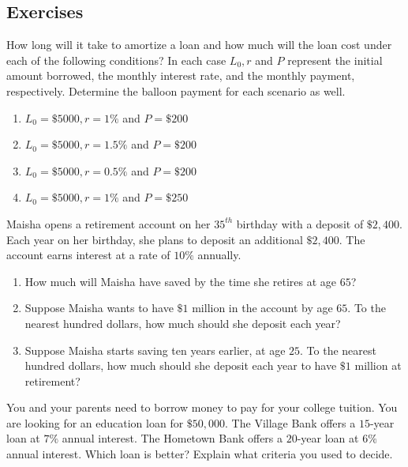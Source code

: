 \documentclass[10pt,]{book}
\theoremstyle{ptxdefinitionnotitle}
\theoremstyle{ptxdefinitiontitle}
\theoremstyle{ptxdefinitionnotitle}
\theoremstyle{ptxdefinitiontitle}
\theoremstyle{ptxdefinitionnotitle}
\theoremstyle{ptxdefinitiontitle}
\numberwithin{equation}{section}
\begin{document}
\subsection*{Exercises}\hypertarget{exercises-3}{}
\begin{divisionexercise}{1}\hypertarget{exercise-12}{}
\hypertarget{p-60}{}%
How long will it take to amortize a loan and how much will the loan cost under each of the following conditions?  In each case \(L_0, r\) and \(P\) represent the initial amount borrowed, the monthly interest rate, and the monthly payment, respectively. Determine the balloon payment for each scenario as well.%
\leavevmode%
\begin{enumerate}[label=(\alph*)]
\item\hypertarget{li-45}{}\(L_0=\$5000, r=1\%\) and \(P=\$200\)%
\item\hypertarget{li-46}{}\(L_0=\$5000, r=1.5\%\) and \(P=\$200\)%
\item\hypertarget{li-47}{}\(L_0=\$5000, r=0.5\%\) and \(P=\$200 \)%
\item\hypertarget{li-48}{}\(L_0=\$5000, r=1\%\) and \(P=\$250\)%
\end{enumerate}
\end{divisionexercise}%
\begin{divisionexercise}{2}\hypertarget{exercise-13}{}
\hypertarget{p-61}{}%
Maisha opens a retirement account on her \(35^{th}\) birthday with a deposit of \(\$2,400\).  Each year on her birthday, she plans to deposit an additional \(\$2,400\).  The account earns interest at a rate of \(10\%\) annually.%
\leavevmode%
\begin{enumerate}[label=(\alph*)]
\item\hypertarget{li-49}{}How much will Maisha have saved by the time she retires at age \(65\)?%
\item\hypertarget{li-50}{}Suppose Maisha wants to have \(\$1\) million in the account by age \(65\).  To the nearest hundred dollars, how much should she deposit each year?%
\item\hypertarget{li-51}{}Suppose Maisha starts saving ten years earlier, at age \(25\).  To the nearest hundred dollars, how much should she deposit each year to have \(\$1\) million at retirement?%
\end{enumerate}
\end{divisionexercise}%
\begin{divisionexercise}{3}\hypertarget{exercise-14}{}
\hypertarget{p-62}{}%
You and your parents need to borrow money to pay for your college tuition.  You are looking for an education loan for \(\$50,000\).  The Village Bank offers a \(15\)-year loan at \(7\%\) annual interest.  The Hometown Bank offers a \(20\)-year loan at \(6\%\) annual interest.  Which loan is better?  Explain what criteria you used to decide.%
\end{divisionexercise}%
\end{document}
